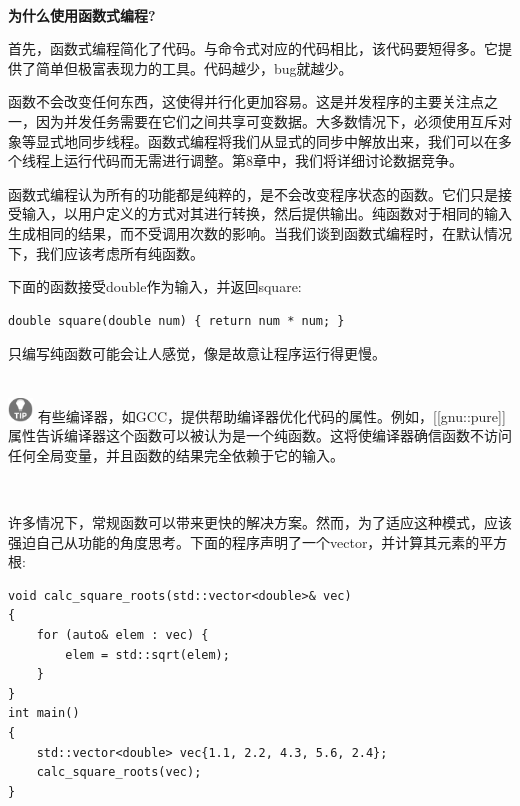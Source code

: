 \noindent\textbf{}\ \par
\textbf{为什么使用函数式编程?} \ \par
首先，函数式编程简化了代码。与命令式对应的代码相比，该代码要短得多。它提供了简单但极富表现力的工具。代码越少，bug就越少。 \par
函数不会改变任何东西，这使得并行化更加容易。这是并发程序的主要关注点之一，因为并发任务需要在它们之间共享可变数据。大多数情况下，必须使用互斥对象等显式地同步线程。函数式编程将我们从显式的同步中解放出来，我们可以在多个线程上运行代码而无需进行调整。第8章中，我们将详细讨论数据竞争。 \par
函数式编程认为所有的功能都是纯粹的，是不会改变程序状态的函数。它们只是接受输入，以用户定义的方式对其进行转换，然后提供输出。纯函数对于相同的输入生成相同的结果，而不受调用次数的影响。当我们谈到函数式编程时，在默认情况下，我们应该考虑所有纯函数。 \par
下面的函数接受double作为输入，并返回square: \par

\begin{lstlisting}[caption={}]
double square(double num) { return num * num; }
\end{lstlisting}

只编写纯函数可能会让人感觉，像是故意让程序运行得更慢。 \par

\hspace*{\fill} \\ %
\includegraphics[width=0.05\textwidth]{images/tip}
有些编译器，如GCC，提供帮助编译器优化代码的属性。例如，[[gnu::pure]]属性告诉编译器这个函数可以被认为是一个纯函数。这将使编译器确信函数不访问任何全局变量，并且函数的结果完全依赖于它的输入。 \par
\noindent\textbf{}\ \par

许多情况下，常规函数可以带来更快的解决方案。然而，为了适应这种模式，应该强迫自己从功能的角度思考。下面的程序声明了一个vector，并计算其元素的平方根: \par

\begin{lstlisting}[caption={}]
void calc_square_roots(std::vector<double>& vec)
{
	for (auto& elem : vec) {
		elem = std::sqrt(elem);
	}
}
int main()
{
	std::vector<double> vec{1.1, 2.2, 4.3, 5.6, 2.4};
	calc_square_roots(vec);
}
\end{lstlisting}

